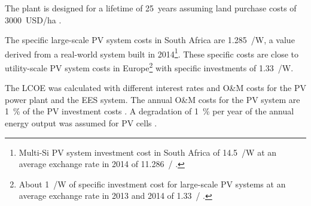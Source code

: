 The plant is designed for a lifetime of \SI{25}{years} assuming land purchase costs of \SI{3000}{USD/\hectare} \cite{Cassell2012}.


The specific large-scale PV system costs in South Africa are \SI{1.285}{\usd/\watt}, a value derived from a real-world system built in 2014\footnote{Multi-Si PV system investment cost in South Africa of \SI{14.5}{\zar/\watt} \cite{Terblanche2015} at an average exchange rate in 2014 of \SI{11.286}{\usd/\zar} \cite{IRS2015}.}. These specific costs are close to utility-scale PV system costs in Europe\footnote{About \SI{1}{\eur/\watt} of specific investment cost for large-scale PV systems \cite{FraunhoferISE2013} at an average exchange rate in 2013 and 2014 of \SI{1.33}{\usd/\eur} \cite{StatistaGmbH2015}.} with specific investments of \SI{1.33}{\usd/\watt}.


The LCOE was calculated with different interest rates and O\&M costs for the PV power plant and the EES system. The annual O\&M costs for the PV system are \SI{1}{\percent} of the PV investment costs \cite{IEA2014a}. A degradation of \SI{1}{\percent} per year of the annual energy output was assumed for PV cells \cite{Tidball2010}.

